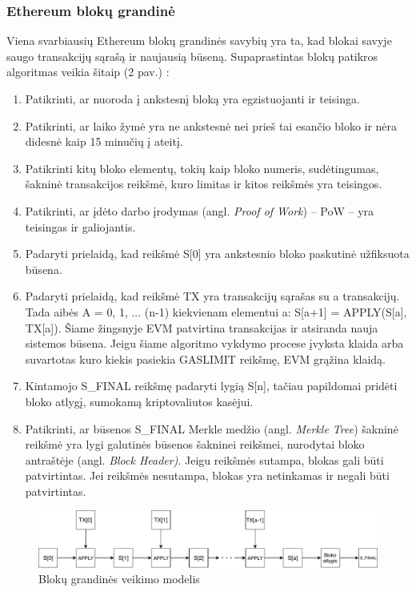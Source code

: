 \documentclass{VUMIFPSkursinis}
\begin{document}
\subsubsection{Ethereum blokų grandinė}
Viena svarbiausių Ethereum blokų grandinės savybių yra ta, kad blokai savyje saugo transakcijų sąrašą ir naujausią būseną. Supaprastintas blokų patikros algoritmas veikia šitaip (2 pav.) \cite{buterin2014next}:
\begin{enumerate}
    \item Patikrinti, ar nuoroda į ankstesnį bloką yra egzistuojanti ir teisinga.
    \item Patikrinti, ar laiko žymė yra ne ankstesnė nei prieš tai esančio bloko ir nėra didesnė kaip 15 minučių į ateitį.
    \item Patikrinti kitų bloko elementų, tokių kaip bloko numeris, sudėtingumas, šakninė transakcijos reikšmė, kuro limitas ir kitos reikšmės yra teisingos.
    \item Patikrinti, ar įdėto darbo įrodymas (angl. \textit{Proof of Work}) – PoW – yra teisingas ir galiojantis.
    \item Padaryti prielaidą, kad reikšmė S[0] yra ankstesnio bloko paskutinė užfiksuota būsena.
    \item Padaryti prielaidą, kad reikšmė TX yra transakcijų sąrašas su a transakcijų. Tada aibės A = {0, 1, ... (n-1)} kiekvienam elementui a: S[a+1] = APPLY(S[a], TX[a]). Šiame žingsnyje EVM patvirtina transakcijas ir atsiranda nauja sistemos būsena. Jeigu šiame algoritmo vykdymo procese įvyksta klaida arba suvartotas kuro kiekis pasiekia GASLIMIT reikšmę, EVM grąžina klaidą.
    \item Kintamojo S\_FINAL reikšmę padaryti lygią S[n], tačiau papildomai pridėti bloko atlygį, sumokamą kriptovaliutos kasėjui.
    \item Patikrinti, ar būsenos S\_FINAL Merkle medžio (angl. \textit{Merkle Tree}) šakninė reikšmė yra lygi galutinės būsenos šakninei reikšmei, nurodytai bloko antraštėje (angl. \textit{Block Header)}. Jeigu reikšmės sutampa, blokas gali būti patvirtintas. Jei reikšmės nesutampa, blokas yra netinkamas ir negali būti patvirtintas.
\end{enumerate}

\begin{figure}[H]
    \centering
    \includegraphics[scale=0.70]{img/pav-eth-chain.pdf}
    \caption{Blokų grandinės veikimo modelis \cite{buterin2014next}}
    \label{img:pav-block-chain}
\end{figure}
\end{document}
